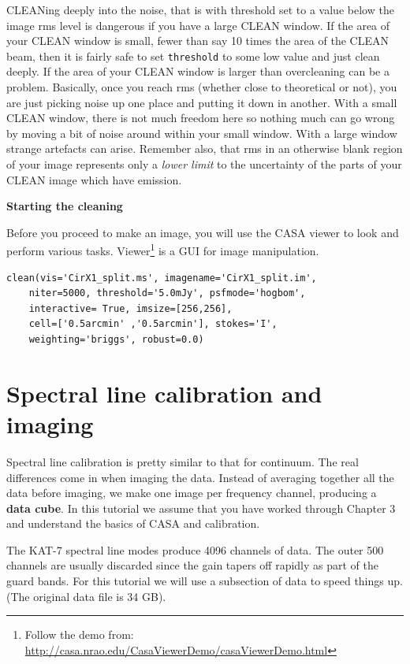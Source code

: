 \documentclass[force,almostfull,justified]{tufte-book}
\begin{document}
CLEANing deeply into the noise, that is with threshold set to a value below the image rms level is
dangerous if you have a large CLEAN window.  If the area of your CLEAN window is small, fewer than say
10 times the area of the CLEAN beam, then it is fairly safe to set {\tt threshold} to some low value
and just clean deeply.  If the area of your CLEAN window is larger than overcleaning can be a problem.
Basically, once you reach rms (whether close to theoretical or not), you are just picking noise up one
place and putting it down in another.  With a small CLEAN window, there is not much freedom here so
nothing much can go wrong by moving a bit of noise around within your small window.  With a large
window strange artefacts can arise.  Remember also, that rms in an otherwise blank region of your
image represents only a {\em lower limit} to the uncertainty of the parts of your CLEAN image which
have emission.

\medskip

\textbf{Starting the cleaning}

Before you proceed to make an image, you will use the CASA viewer to look and perform various tasks.
Viewer\footnote {Follow the demo from: \url{http://casa.nrao.edu/CasaViewerDemo/casaViewerDemo.html}}
is a GUI for image manipulation.

\begin{casacmd}
\begin{verbatim}
clean(vis='CirX1_split.ms', imagename='CirX1_split.im',
    niter=5000, threshold='5.0mJy', psfmode='hogbom',
    interactive= True, imsize=[256,256],
    cell=['0.5arcmin' ,'0.5arcmin'], stokes='I',
    weighting='briggs', robust=0.0)
\end{verbatim}
\end{casacmd}


\chapter{Spectral line calibration and imaging}
\label{ch:spectral}

Spectral line calibration is pretty similar to that for continuum.  The real differences come in when
imaging the data. Instead of averaging together all the data before imaging, we make one image per
frequency channel, producing a \textbf{data cube}. In this tutorial we assume that you have worked
through Chapter 3 and understand the basics of CASA and calibration.

The KAT-7 spectral line modes produce 4096 channels of data.  The outer 500 channels are usually
discarded since the gain tapers off rapidly as part of the guard bands.  For this tutorial we will use
a subsection of data to speed things up. (The original data file is 34 GB).
\end{document}
